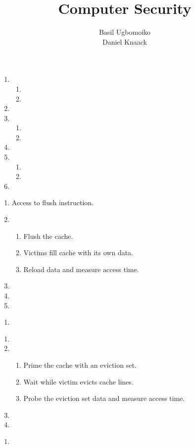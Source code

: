 \documentclass[sheet=2, prefix, english]{dexercise}
\title{Computer Security}
\author{Basil Ugbomoiko\\Daniel Knaack}
\begin{document}
\task[Caches]

\begin{enumerate}
  \item
    \begin{enumerate}
      \item
      \item
    \end{enumerate}
  \item
  \item
    \begin{enumerate}
      \item
      \item
    \end{enumerate}
  \item
  \item
    \begin{enumerate}
      \item
      \item
    \end{enumerate}
  \item
\end{enumerate}


\begin{enumerate}
  \item
    Access to flush instruction.
  \item
    \begin{enumerate}
      \item Flush the cache.
      \item Victims fill cache with its own data.
      \item Reload data and measure access time.
    \end{enumerate}
  \item
  \item
  \item
\end{enumerate}


\begin{enumerate}
  \item
\end{enumerate}


\begin{enumerate}
  \item
  \item
    \begin{enumerate}
      \item Prime the cache with an eviction set.
      \item Wait while victim evicts cache lines.
      \item Probe the eviction set data and measure access time.
    \end{enumerate}
  \item
  \item
\end{enumerate}


\begin{enumerate}
  \item
\end{enumerate}
\end{document}
